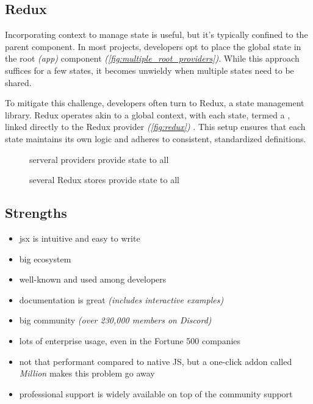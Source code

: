 \subsection{Redux}
\label{subsec:redux}

Incorporating context to manage state is useful, but it's typically confined to the parent component. In most projects, developers opt to place the global state in the root \textit{(app)} component \textit{(\autoref{fig:multiple_root_providers})}. While this approach suffices for a few states, it becomes unwieldy when multiple states need to be shared.

To mitigate this challenge, developers often turn to Redux, a state management library. Redux operates akin to a global context, with each state, termed a , linked directly to the Redux provider \textit{(\autoref{fig:redux})} \cite{redux:overview}. This setup ensures that each state maintains its own logic and adheres to consistent, standardized definitions.

\begin{figure}[ht]
    \centering
    \begin{minipage}[t]{0.3\textwidth}
        \centering
        
        \caption{serveral providers provide state to all}
        \label{fig:multiple_root_providers}
    \end{minipage}
    \hfill
    \begin{minipage}[t]{0.6\textwidth}
        \centering
        
        \caption{several Redux stores provide state to all}
        \label{fig:redux}
    \end{minipage}
\end{figure}

\subsection{Strengths}
\label{subsec:react:strengths}
\begin{itemize}
    \item \acrshort{jsx} is intuitive and easy to write
    \item big ecosystem
    \item well-known and used among developers 
    \item documentation is great \textit{(includes interactive examples)}
    \item big community \textit{(over 230,000 members on Discord)}
    \item lots of enterprise usage, even in the Fortune 500 companies \cite{buildin:react_companies}
    \item not that performant compared to native JS, but a one-click addon called \textsl{Million} \cite{million} makes this problem go away
    \item professional support is widely available on top of the community support
\end{itemize}

